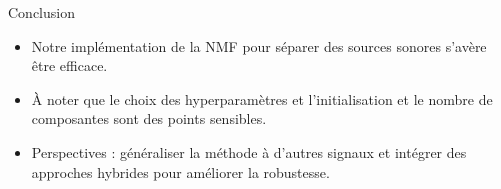 \documentclass{beamer}
\begin{document}
\begin{frame}{Conclusion}
    \begin{itemize}
        \item Notre implémentation de la NMF pour séparer des sources sonores s'avère être efficace.
        \item À noter que le choix des hyperparamètres et l'initialisation et le nombre de composantes sont des points sensibles.
        \item Perspectives : généraliser la méthode à d'autres signaux et intégrer des approches hybrides pour améliorer la robustesse.
    \end{itemize}
\end{frame}
\end{document}
